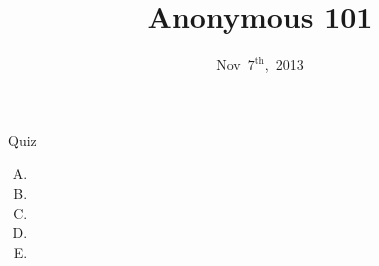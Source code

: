 \documentclass{beamer}
\title{Anonymous 101}
\date{Nov~$7^{\text{th}}$,~2013}
\begin{document}
\begin{frame}
\titlepage
\end{frame}

\begin{frame}{Quiz}
%
%
\begin{enumerate}[(A)]
\item<1>
\item<1-2>
\item<1>
\item<1>
\item<1>
\end{enumerate}
\end{frame}
\end{document}
